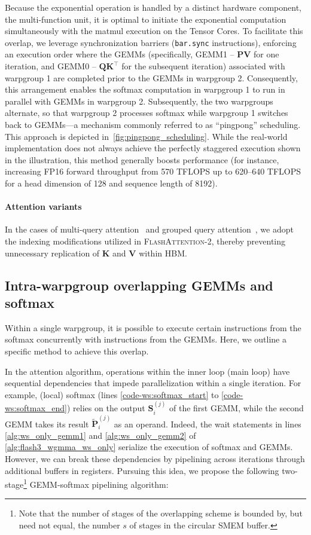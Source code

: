 \begin{enumerate}
Because the exponential operation is handled by a distinct hardware component, the multi-function unit, it is optimal to initiate the exponential computation simultaneously with the matmul execution on the Tensor Cores. To facilitate this overlap, we leverage synchronization barriers (\texttt{bar.sync} instructions), enforcing an execution order where the GEMMs (specifically, GEMM1 -- $\mathbf{P} \mathbf{V}$ for one iteration, and GEMM0 -- $\mathbf{Q} \mathbf{K}^\top$ for the subsequent iteration) associated with warpgroup 1 are completed prior to the GEMMs in warpgroup 2. Consequently, this arrangement enables the softmax computation in warpgroup 1 to run in parallel with GEMMs in warpgroup 2. Subsequently, the two warpgroups alternate, so that warpgroup 2 processes softmax while warpgroup 1 switches back to GEMMs—a mechanism commonly referred to as ``pingpong'' scheduling. This approach is depicted in~\cref{fig:pingpong_scheduling}. While the real-world implementation does not always achieve the perfectly staggered execution shown in the illustration, this method generally boosts performance (for instance, increasing FP16 forward throughput from 570 TFLOPS up to 620–640 TFLOPS for a head dimension of 128 and sequence length of 8192).

\paragraph{Attention variants} In the cases of multi-query attention~\citep{shazeer2019fast} and grouped query attention~\citep{ainslie2023gqa}, we adopt the indexing modifications utilized in \textsc{FlashAttention-2}, thereby preventing unnecessary replication of $\mathbf{K}$ and $\mathbf{V}$ within HBM.

\subsection{Intra-warpgroup overlapping GEMMs and softmax}

Within a single warpgroup, it is possible to execute certain instructions from the softmax concurrently with instructions from the GEMMs. Here, we outline a specific method to achieve this overlap.

In the attention algorithm, operations within the inner loop (main loop) have sequential dependencies that impede parallelization within a single iteration. For example, (local) softmax (lines \ref{code-ws:softmax_start} to \ref{code-ws:softmax_end}) relies on the output $\mathbf{S}_i^{(j)}$ of the first GEMM, while the second GEMM takes its result $\widetilde{\mathbf{P}}_i^{(j)}$ as an operand. Indeed, the wait statements in lines \ref{alg:ws_only_gemm1} and \ref{alg:ws_only_gemm2} of \cref{alg:flash3_wgmma_ws_only} serialize the execution of softmax and GEMMs. However, we can break these dependencies by pipelining across iterations through additional buffers in registers. Pursuing this idea, we propose the following two-stage\footnote{Note that the number of stages of the overlapping scheme is bounded by, but need not equal, the number $s$ of stages in the circular SMEM buffer.} GEMM-softmax pipelining algorithm:


\end{enumerate}

